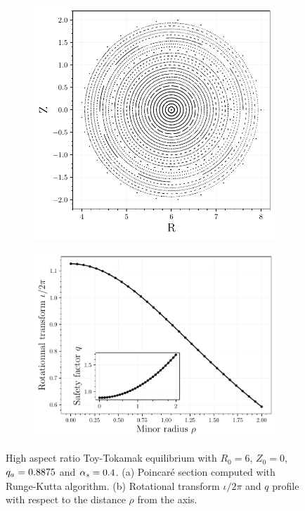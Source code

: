 \begin{figure}
    \centering
    \begin{subfigure}[t]{0.43\textwidth}
        \centering
        \includegraphics[width=\textwidth]{images/high-aspect-ratio/unperturbed.pdf}
        \caption{\label{fig:toyha-basis-p}}
    \end{subfigure}
    \hfill
    \begin{subfigure}[t]{0.54\textwidth}
        \centering
        \includegraphics[width=\textwidth]{images/high-aspect-ratio/iota_q.pdf}
        \caption{\label{fig:toyha-basis-iotaq}}
    \end{subfigure}
    \caption{High aspect ratio Toy-Tokamak equilibrium with $R_0 = 6$, $Z_0 = 0$, $q_a = 0.8875$ and $\alpha_s = 0.4$. (a) Poincar\'e section computed with Runge-Kutta algorithm. (b) Rotational transform $\iota/2\pi$ and $q$ profile with respect to the distance $\rho$ from the axis.}
    \label{fig:toyha-basis}
\end{figure}

